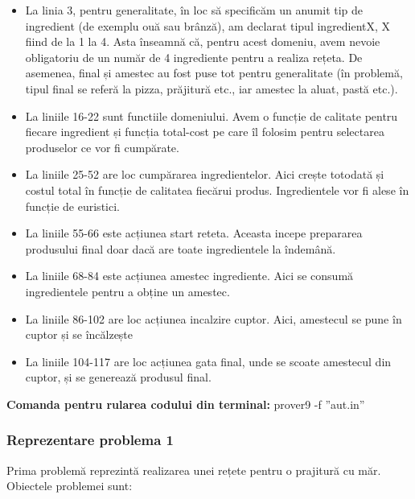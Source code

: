   \begin{itemize}
    \setlength\itemsep{0em}
    \item La linia 3, pentru generalitate, în loc să specificăm un anumit tip de ingredient (de exemplu ouă sau brânză), am declarat
  tipul ingredientX, X fiind de la 1 la 4. Asta înseamnă că, pentru acest domeniu, avem nevoie obligatoriu de un număr de 4 
  ingrediente pentru a realiza rețeta. De asemenea, final și amestec au fost puse tot pentru generalitate (în problemă, tipul 
  final se referă la pizza, prăjitură etc., iar amestec la aluat, pastă etc.). 
    \item 	La liniile 16-22 sunt functiile domeniului. Avem o funcție de calitate pentru fiecare ingredient și funcția total-cost pe care
  îl folosim pentru selectarea produselor ce vor fi cumpărate.
    \item 	La liniile 25-52 are loc cumpărarea ingredientelor. Aici crește totodată și costul total în funcție de calitatea fiecărui 
  produs. Ingredientele vor fi alese în funcție de euristici.
    \item La liniile 55-66 este acțiunea start reteta. Aceasta incepe prepararea produsului final doar dacă are toate ingredientele la 
  îndemână.
    \item La liniile 68-84 este acțiunea amestec ingrediente. Aici se consumă ingredientele pentru a obține un amestec.
    \item La liniile 86-102 are loc acțiunea incalzire cuptor. Aici, amestecul se pune în cuptor și se încălzește
    \item La liniile 104-117 are loc acțiunea gata final, unde se scoate amestecul din cuptor, și se generează produsul final.
  
\end{itemize}


\bigskip
    



 \begin{itemize}
    \setlength\itemsep{0em}
 


\end{itemize}


\textbf{Comanda pentru rularea codului din terminal:}
prover9 -f ”aut.in”
\subsubsection{Reprezentare problema 1}
Prima problemă reprezintă realizarea unei rețete pentru o prajitură cu măr.
Obiectele problemei sunt:

